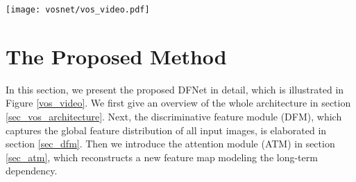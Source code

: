 \documentclass[runningheads]{llncs}
\begin{document}
\begin{figure*}[t!]
	\centering
	\texttt{[image: vosnet/vos\_video.pdf]}
	\caption{Overall pipeline of the proposed method. The features are first obtained from the encoder module and goes through the discriminative feature module (DFM) to extract  discriminative features. The discriminative features are then used by attention module (ATM) to recontruct a new feature map, which is used to correlate the input frames.}
	\label{vos_video}
\end{figure*}
\section{The Proposed Method}
\indent In this section, we present the proposed DFNet in detail, which is illustrated in Figure \ref{vos_video}. We first give an overview of the whole architecture in section \ref{sec_vos_architecture}. Next, the discriminative feature module (DFM), which captures the global feature distribution of all input images, is elaborated in section \ref{sec_dfm}. Then we introduce the attention module (ATM) in section \ref{sec_atm}, which reconstructs a new feature map modeling the long-term dependency. 
\end{document}
